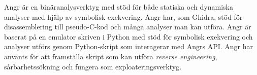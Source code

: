 Angr är en binäranalysverktyg med stöd för både statiska och dynamiska analyser
med hjälp av symbolisk exekvering. Angr har, som Ghidra, stöd för
disassemblering till pseudo-C-kod och många analyser man kan utföra. Angr är
baserat på en emulator skriven i Python med stöd för symbolisk exekvering och
analyser utförs genom Python-skript som interagerar med Angrs API. Angr har
använts för att framställa skript som kan utföra \emph{reverse engineering},
sårbarhetssökning och fungera som exploateringsverktyg\cite{angr_docs}.
